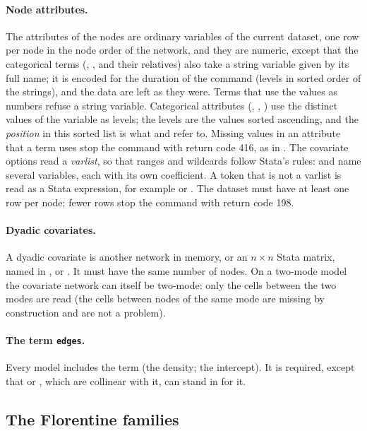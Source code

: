\paragraph{Node attributes.} The attributes of the nodes are ordinary variables of the current dataset, one row per node in the node order of the network, and they are numeric, except that the categorical terms (, ,  and their relatives) also take a string variable given by its full name; it is encoded for the duration of the command (levels in sorted order of the strings), and the data are left as they were. Terms that use the values as numbers refuse a string variable. Categorical attributes (, , ) use the distinct values of the variable as levels; the levels are the values sorted ascending, and the \emph{position} in this sorted list is what  and  refer to. Missing values in an attribute that a term uses stop the command with return code 416, as in \ergm{}. The covariate options read a \emph{varlist}, so that ranges and wildcards follow Stata's rules:  and  name several variables, each with its own coefficient. A token that is not a varlist is read as a Stata expression, for example  or . The dataset must have at least one row per node; fewer rows stop the command with return code 198.

\paragraph{Dyadic covariates.} A dyadic covariate is another network in memory, or an $n\times n$ Stata matrix, named in ,  or . It must have the same number of nodes. On a two-mode model the covariate network can itself be two-mode: only the cells between the two modes are read (the cells between nodes of the same mode are missing by construction and are not a problem).

\paragraph{The term \texttt{edges}.} Every model includes the term  (the density; the intercept). It is required, except that  or , which are collinear with it, can stand in for it.

\subsection*{The Florentine families}

